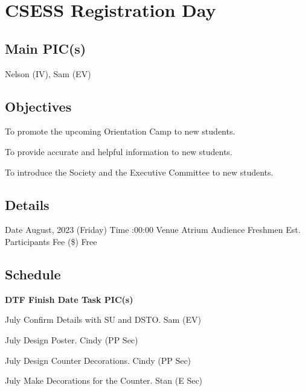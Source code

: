 \section{CSESS Registration Day}

\subsection{Main PIC(s)}
Nelson (IV), Sam (EV)

\subsection{Objectives}
\startitemize
\item To promote the upcoming Orientation Camp to new students.
\item To provide accurate and helpful information to new students.
\item To introduce the Society and the Executive Committee to new students.
\stopitemize

\subsection{Details}
\starttabulate[|rB|l|]
\NC Date
 August, 2023 (Friday) \NR
\NC Time
:00:00 \NR
\NC Venue
\NC Atrium \NR
\NC Audience
\NC Freshmen \NR
\NC Est. Participants
 \NR
\NC Fee (\$)
\NC Free \NR
\stoptabulate

\subsection{Schedule}

\setupTABLE[c][1][width=0.75in]
\setupTABLE[c][2][width=1in]
\setupTABLE[c][3][width=3in]
\setupTABLE[c][4][width=1.25in]
\bTABLE
\bTABLEhead

\bTR\bTH    \bf{DTF}
\eTH\bTH    \bf{Finish Date}
\eTH\bTH    \bf{Task}
\eTH\bTH    \bf{PIC(s)}
\eTH\eTR

\eTABLEhead
\bTABLEbody

\bTR{}
\eTD{} July
\eTD\bTD Confirm Details with SU and DSTO.
\eTD\bTD Sam (EV)
\eTD\eTR

\bTR{}
\eTD{} July
\eTD\bTD Design Poster.
\eTD\bTD Cindy (PP Sec)
\eTD\eTR

\bTR{}
\eTD{} July
\eTD\bTD Design Counter Decorations.
\eTD\bTD Cindy (PP Sec)
\eTD\eTR

\bTR{}
\eTD{} July
\eTD\bTD Make Decorations for the Counter.
\eTD\bTD Stan (E Sec)
\eTD\eTR

